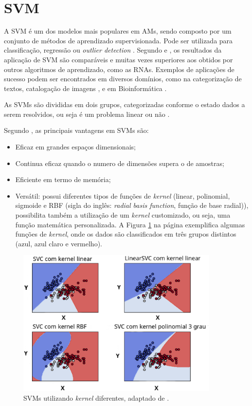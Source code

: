 \section{SVM}

A SVM é um dos modelos mais populares em AMs, sendo composto por um conjunto de métodos de aprendizado supervisionada. Pode ser utilizada para classificação, regressão ou \textit{outlier detection} \cite{scikitlearn}. Segundo  e , os resultados da aplicação de SVM são comparáveis e muitas vezes superiores aos obtidos por outros algoritmos de aprendizado, como as RNAs. Exemplos de aplicações de sucesso podem ser encontrados em diversos domínios, como na categorização de textos,  catalogação de imagens \cite{pontil1998support}, e em Bioinformática \cite{noble2004support}.

As SVMs são divididas em dois grupos, categorizadas conforme o estado dados a serem resolvidos, ou seja é um problema linear ou não \cite{lorena2007introduccao}.

Segundo , as principais vantagens em SVMs são:

\begin{itemize}
    \item Eficaz em grandes espaços dimensionais;
    \item Continua eficaz quando o numero de dimensões supera o de amostras;
    \item Eficiente em termo de memória;
    \item Versátil: possui diferentes tipos de funções de \textit{kernel} (linear, polinomial, sigmoide e RBF (sigla do inglês: \textit{radial basis function}, função de base radial)), possibilita também a utilização de um \textit{kernel} customizado, ou seja, uma função matemática personalizada. A Figura \ref{svmkernel} na página \pageref{svmkernel} exemplifica algumas funções de \textit{kernel}, onde os dados são classificados em três grupos distintos (azul, azul claro e vermelho).
\end{itemize}

\begin{figure}[!htb]
    \centering
     \includegraphics[width=0.9\textwidth]{figuras/svmkernel.eps}
     \caption{SVMs utilizando \textit{kernel} diferentes, adaptado de .}
     \label{svmkernel}
 \end{figure}

